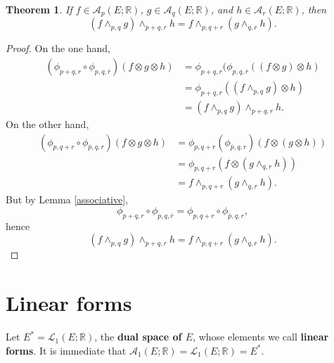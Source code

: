 \documentclass{article}
\newtheorem{theorem}{Theorem}
\theoremstyle{definition}
\begin{document}
\begin{theorem}
If $f \in \mathscr{A}_p(E;\mathbb{R})$, $g \in \mathscr{A}_q(E;\mathbb{R})$,
and $h \in \mathscr{A}_r(E;\mathbb{R})$, then 
\[
(f \wedge_{p,q} g) \wedge_{p+q,r} h = f \wedge_{p,q+r} (g \wedge_{q,r} h).
\]
\end{theorem}
\begin{proof}
On the one hand,
\begin{align*}
(\phi_{p+q,r} \circ \phi_{p,q,\overline{r}})(f \otimes g \otimes h)&=\phi_{p+q,r}(\phi_{p,q,\overline{r}}((f \otimes g) \otimes h)\\
&=\phi_{p+q,r}((f \wedge_{p,q} g) \otimes h)\\
&=(f \wedge_{p,q} g) \wedge_{p+q,r} h.
\end{align*}
On the other hand,
\begin{align*}
(\phi_{p,q+r} \circ \phi_{\overline{p},q,r})(f \otimes g \otimes h)&=\phi_{p,q+r}(\phi_{\overline{p},q,r})(f \otimes (g \otimes h))\\
&=\phi_{p,q+r}(f \otimes (g \wedge_{q,r} h))\\
&=f \wedge_{p,q+r} (g \wedge_{q,r} h).
\end{align*}
But by Lemma \ref{associative}, 
\[
\phi_{p+q,r} \circ \phi_{p,q,\overline{r}} = \phi_{p,q+r} \circ \phi_{\overline{p},q,r},
\]
hence
\[
(f \wedge_{p,q} g) \wedge_{p+q,r} h = f \wedge_{p,q+r} (g \wedge_{q,r} h).
\]
\end{proof}



\section{Linear forms}
Let $E^* = \mathscr{L}_1(E;\mathbb{R})$, the \textbf{dual space of $E$}, whose elements we call \textbf{linear forms}.
It is immediate that $\mathscr{A}_1(E;\mathbb{R}) = \mathscr{L}_1(E;\mathbb{R})=E^*$.
\end{document}
